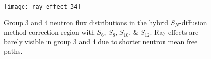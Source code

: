 \begin{figure}[p]
  \small
  \centering
  \texttt{[image: ray-effect-34]}
  \caption{Group 3 and 4 neutron flux distributions in the hybrid $S_N$-diffusion method correction
  region with $S_6$, $S_8$, $S_{10}$, \& $S_{12}$. Ray effects are barely visible in group
  3 and 4 due to shorter neutron mean free paths.}
  \label{fig:ray-effect-34}
\end{figure}

%
%
%
%
